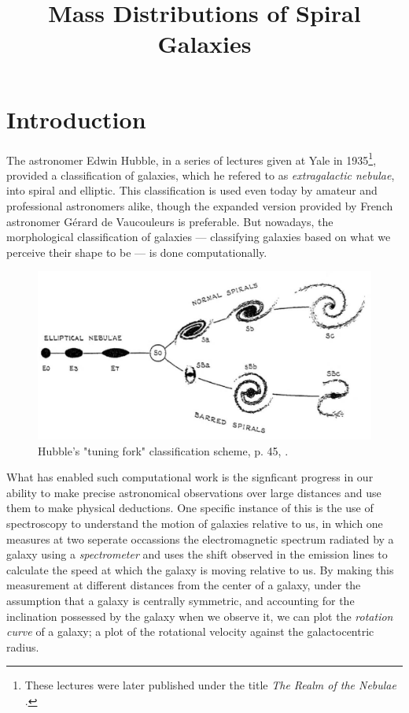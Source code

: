 \documentclass{article}
\title{Mass Distributions of Spiral Galaxies}
\date{}
\begin{document}
\maketitle

\section{Introduction}\label{sec:introduction}

The astronomer Edwin Hubble, in a series of lectures given at Yale in 1935\footnote{These lectures were later published under the title \textit{The Realm of the Nebulae} \cite{Hubble1936}.}, provided a classification of galaxies, which he refered to as \textit{extragalactic nebulae}, into spiral and elliptic.
This classification is used even today by amateur and professional astronomers alike, though the expanded version provided by French astronomer Gérard de Vaucouleurs is preferable.
But nowadays, the morphological classification of galaxies --- classifying galaxies based on what we perceive their shape to be --- is done computationally.

\begin{figure}[h!]
    \centering
    \includegraphics[width=0.7\linewidth]{hubblefork}
    \caption{Hubble's "tuning fork" classification scheme, p. 45, \cite{Hubble1936}.}
    \label{fig:hubblefork}
\end{figure}

What has enabled such computational work is the signficant progress in our ability to make precise astronomical observations over large distances and use them to make physical deductions.
One specific instance of this is the use of spectroscopy to understand the motion of galaxies relative to us, in which one measures at two seperate occassions the electromagnetic spectrum radiated by a galaxy using a \textit{spectrometer} and uses the shift observed in the emission lines to calculate the speed at which the galaxy is moving relative to us.
By making this measurement at different distances from the center of a galaxy, under the assumption that a galaxy is centrally symmetric, and accounting for the inclination possessed by the galaxy when we observe it, we can plot the \textit{rotation curve} of a galaxy; a plot of the rotational velocity against the galactocentric radius.
\end{document}
